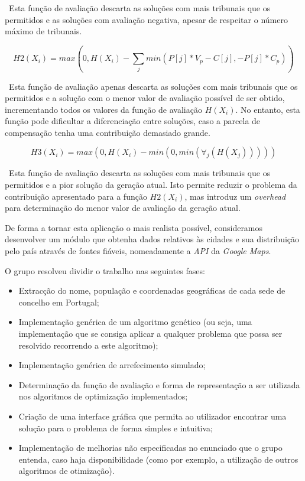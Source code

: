\documentclass[11pt,a4paper,reqno]{article}
\numberwithin{equation}{section}
\begin{document}
\
Esta função de avaliação descarta as soluções com mais tribunais que os permitidos e as soluções com avaliação negativa, apesar de respeitar o número máximo de tribunais.

\begin{equation} %
    H2(X_i) = max(0, H(X_i) - \sum\limits_{j} min(P[j] * V_p - C[j], -P[j] * C_p))
\end{equation}

\
Esta função de avaliação apenas descarta as soluções com mais tribunais que os permitidos e a solução com o menor valor de avaliação possível de ser obtido, incrementando todos os valores da função de avaliação $H(X_i)$. No entanto, esta função pode dificultar a diferenciação entre soluções, caso a parcela de compensação tenha uma contribuição demasiado grande.

\begin{equation}
    H3(X_i) = max(0, H(X_i) - min(0, min(\forall _j  (H(X_j)))))
\end{equation}

\
Esta função de avaliação descarta as soluções com mais tribunais que os permitidos e a pior solução da geração atual. Isto permite reduzir o problema da contribuição apresentado para a função $H2(X_i)$, mas introduz um \textit{overhead} para determinação do menor valor de avaliação da geração atual.

De forma a tornar esta aplicação o mais realista possível, consideramos desenvolver um módulo que obtenha dados relativos às cidades e sua distribuição pelo país através de fontes fiáveis, nomeadamente a \textit{API} da \textit{Google Maps}. 

O grupo resolveu dividir o trabalho nas seguintes fases:
\begin{itemize}
\item Extracção do nome, população e coordenadas geográficas de cada sede de concelho em Portugal;
\item Implementação genérica de um algoritmo genético (ou seja, uma implementação que se consiga aplicar a qualquer problema que possa ser resolvido recorrendo a este algoritmo);
\item Implementação genérica de arrefecimento simulado;
\item Determinação da função de avaliação e forma de representação a ser utilizada nos algoritmos de optimização implementados;
\item Criação de uma interface gráfica que permita ao utilizador encontrar uma solução para o problema de forma simples e intuitiva;
\item Implementação de melhorias não especificadas no enunciado que o grupo entenda, caso haja disponibilidade (como por exemplo, a utilização de outros algoritmos de otimização).
\end{itemize}
\end{document}
